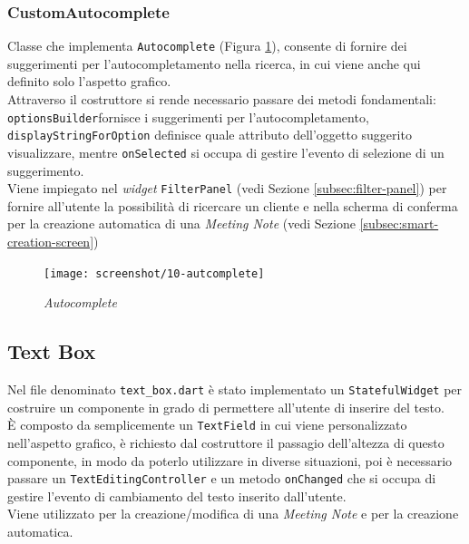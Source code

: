 \subsubsection*{CustomAutocomplete}
\label{subsubsec:custom-autocomplete}

Classe che implementa \lstinline{Autocomplete} \cite{site:autocomplete} (Figura \ref{fig:autocomplete}), consente di fornire dei suggerimenti per l'autocompletamento nella ricerca, in cui viene anche qui definito solo l'aspetto grafico. \\
Attraverso il costruttore si rende necessario passare dei metodi fondamentali: \lstinline{optionsBuilder}fornisce i suggerimenti per l'autocompletamento, \lstinline{displayStringForOption} definisce quale attributo dell'oggetto suggerito visualizzare, mentre \lstinline{onSelected} si occupa di gestire l'evento di selezione di un suggerimento.\\
Viene impiegato nel \emph{widget} \lstinline{FilterPanel} (vedi Sezione \ref{subsec:filter-panel}) per fornire all'utente la possibilità di ricercare un cliente e nella scherma di conferma per la creazione automatica di una \emph{Meeting Note} (vedi Sezione \ref{subsec:smart-creation-screen})

\begin{figure}[!h] 
    \centering 
    \texttt{[image: screenshot/10-autcomplete]} 
    \caption{\emph{Autocomplete}}
    \label{fig:autocomplete}
\end{figure}

\subsection{Text Box}
\label{subsec:text-box}

Nel file denominato \lstinline{text_box.dart} è stato implementato un \lstinline{StatefulWidget} per costruire un componente in grado di permettere all'utente di inserire del testo.\\
È composto da semplicemente un \lstinline{TextField} \cite{site:text-field} in cui viene personalizzato nell'aspetto grafico, è richiesto dal costruttore il passagio dell'altezza di questo componente, in modo da poterlo utilizzare in diverse situazioni, poi è necessario passare un \lstinline{TextEditingController} \cite{site:text-editing-controller} e un metodo \lstinline{onChanged} che si occupa di gestire l'evento di cambiamento del testo inserito dall'utente.\\
Viene utilizzato per la creazione/modifica di una \emph{Meeting Note} e per la creazione automatica.

